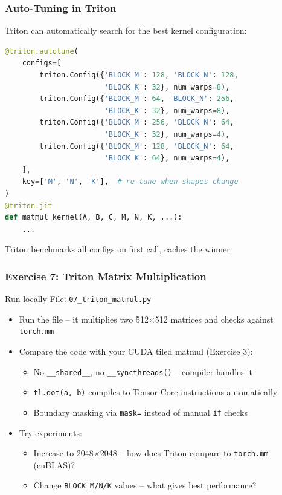 \documentclass[aspectratio=169]{beamer}
\begin{document}
\begin{frame}[fragile]
	\frametitle{Auto-Tuning in Triton}
	Triton can automatically search for the best kernel configuration:
	\begin{lstlisting}[language=Python]
@triton.autotune(
    configs=[
        triton.Config({'BLOCK_M': 128, 'BLOCK_N': 128,
                       'BLOCK_K': 32}, num_warps=8),
        triton.Config({'BLOCK_M': 64, 'BLOCK_N': 256,
                       'BLOCK_K': 32}, num_warps=8),
        triton.Config({'BLOCK_M': 256, 'BLOCK_N': 64,
                       'BLOCK_K': 32}, num_warps=4),
        triton.Config({'BLOCK_M': 128, 'BLOCK_N': 64,
                       'BLOCK_K': 64}, num_warps=4),
    ],
    key=['M', 'N', 'K'],  # re-tune when shapes change
)
@triton.jit
def matmul_kernel(A, B, C, M, N, K, ...):
    ...
	\end{lstlisting}
	\vspace{0.3em}
	Triton benchmarks all configs on first call, caches the winner.
\end{frame}

\begin{frame}
	\frametitle{Exercise 7: Triton Matrix Multiplication}
	\begin{block}{Run locally}
		File: \texttt{07\_triton\_matmul.py}
	\end{block}
	\vspace{0.5em}
	\begin{itemize}
		\item Run the file -- it multiplies two 512$\times$512 matrices and checks against \texttt{torch.mm}
		\item Compare the code with your CUDA tiled matmul (Exercise 3):
		      \begin{itemize}
			      \item No \texttt{\_\_shared\_\_}, no \texttt{\_\_syncthreads()} -- compiler handles it
			      \item \texttt{tl.dot(a, b)} compiles to Tensor Core instructions automatically
			      \item Boundary masking via \texttt{mask=} instead of manual \texttt{if} checks
		      \end{itemize}
		\item Try experiments:
		      \begin{itemize}
			      \item Increase to 2048$\times$2048 -- how does Triton compare to \texttt{torch.mm} (cuBLAS)?
			      \item Change \texttt{BLOCK\_M/N/K} values -- what gives best performance?
		      \end{itemize}
	\end{itemize}
\end{frame}
\end{document}

